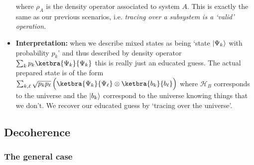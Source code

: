 \documentclass[10pt]{article}
\DeclarePairedDelimiter\ket{\lvert}{\rangle}
\newcommand{\hilb}{\mathcal{H}}
\begin{document}
\begin{itemize}
                    where $\rho_A$ is the density operator associated to system $A$.
                    This is exactly the same as our previous scenarios, i.e. \emph{tracing over a subsystem is a `valid' operation}.
                \item \textbf{Interpretation:} when we describe mixed states as being `state $\ket{\Psi_k}$ with probability $p_k$' and thus described by density operator $\sum_k p_k\ketbra{\Psi_k}{\Psi_k}$ this is really just an educated guess.
                The actual prepared state is of the form $\sum_{k,\ell}\sqrt{p_kp_\ell}\,\Big(\ketbra{\Psi_k}{\Psi_\ell}\otimes\ketbra{b_k}{b_\ell}\Big)$ where $\hilb_B$ corresponds to the universe and the $\ket{b_k}$ correspond to the universe knowing things that we don't.
                    We recover our educated guess by `tracing over the universe'.
            \end{itemize}

        \subsection{Decoherence}

            \subsubsection{The general case}
\end{document}
